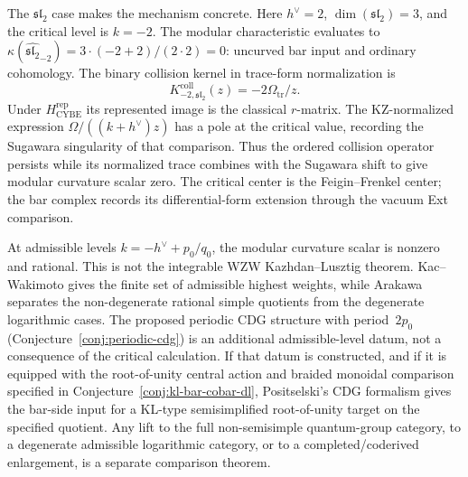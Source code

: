 The $\mathfrak{sl}_2$ case makes the mechanism concrete. Here
$h^\vee = 2$, $\dim(\mathfrak{sl}_2) = 3$, and the critical level
is $k = -2$. The modular characteristic evaluates to
$\kappa(\widehat{\mathfrak{sl}_2}_{-2}) = 3 \cdot (-2 + 2)/(2 \cdot
2) = 0$: uncurved bar input and ordinary cohomology. The binary
collision kernel in trace-form normalization is
\[
 K_{-2,\mathfrak{sl}_2}^{\mathrm{coll}}(z)
 =-2\Omega_{\mathrm{tr}}/z.
\]
Under $H_{\mathrm{CYBE}}^{\mathrm{rep}}$ its represented image is the
classical $r$-matrix.  The KZ-normalized expression
$\Omega/((k+h^\vee)z)$ has a pole at the critical value, recording the
Sugawara singularity of that comparison.  Thus the ordered collision
operator persists while its normalized trace combines with the
Sugawara shift to give modular curvature scalar zero. The critical center is the
Feigin--Frenkel center; the bar complex records its
differential-form extension through the vacuum Ext comparison.

At admissible levels $k = -h^\vee + p_0/q_0$, the modular curvature scalar
is nonzero and rational. This is not the integrable WZW
Kazhdan--Lusztig theorem. Kac--Wakimoto gives the finite set of
admissible highest weights, while Arakawa separates the
non-degenerate rational simple quotients from the degenerate
logarithmic cases. The proposed periodic CDG structure with
period~$2p_0$ (Conjecture~\ref{conj:periodic-cdg}) is an additional
admissible-level datum, not a consequence of the critical calculation.
If that datum is constructed, and if it is equipped with the
root-of-unity central action and braided monoidal comparison specified
in Conjecture~\ref{conj:kl-bar-cobar-dl}, Positselski's CDG formalism
gives the bar-side input for a KL-type semisimplified
root-of-unity target on the specified quotient. Any lift to the full
non-semisimple quantum-group category, to a degenerate admissible
logarithmic category, or to a completed/coderived enlargement, is a
separate comparison theorem.

